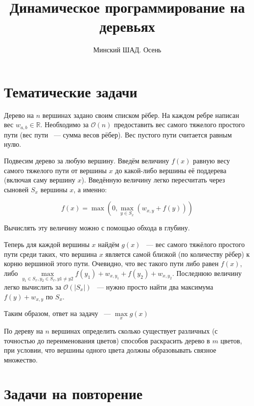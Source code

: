 \documentclass[addpoints]{exam}
\title{Динамическое программирование на деревьях}
\author{Минский ШАД. Осень}
\begin{document}
\printanswers
\maketitle

\begin{questions}

\section{Тематические задачи}

\question[1] \label{task1} Дерево на $n$ вершинах задано своим списком рёбер. На каждом ребре написан вес $w_{a,b} \in \mathbb{R}$. Необходимо за $\mathcal{O}(n)$ предоставить вес самого тяжелого простого пути (вес пути ~--- сумма весов рёбер). Вес пустого пути считается равным нулю. 

\begin{solution}
Подвесим дерево за любую вершину. Введём величину $f(x)$ равную весу самого тяжелого пути от вершины $x$ до какой-либо вершины её поддерева (включая саму вершину $x$). Введённую величину легко пересчитать через сыновей $S_x$ вершины $x$, а именно: 

$$f(x) = \max\left(0, \max_{y \in S_x}(w_{x,y} + f(y))\right)$$

Вычислять эту величину можно с помощью обхода в глубину.

Теперь для каждой вершины $x$ найдём $g(x)$ ~--- вес самого тяжёлого простого пути среди таких, что вершина $x$ является самой близкой (по количеству рёбер) к корню вершиной этого пути. Очевидно, что вес такого пути либо равен $f(x)$, либо $\max\limits_{y_1 \in S_x, y_2 \in S_x, y1 \neq y2} f(y_1) + w_{x, y_1} + f(y_2) + w_{x, y_2}$. Последнюю величину легко вычислить за $\mathcal{O}(|S_x|)$ ~--- нужно просто найти два максимума $f(y) + w_{x, y}$ по $S_x$. 

Таким образом, ответ на задачу ~--- $\max\limits_x g(x)$

\end{solution}

\question[3] По дереву на $n$ вершинах определить сколько существует различных (с точностью до переименования цветов) способов раскрасить дерево в $m$ цветов, при условии, что вершины одного цвета должны образовывать связное множество.

\section{Задачи на повторение}


\end{questions}
\end{document}
